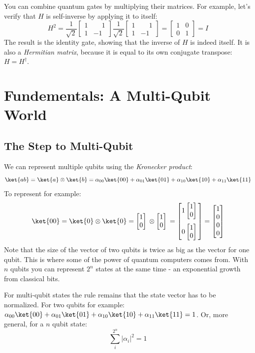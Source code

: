 \documentclass[11pt]{article}
\newcommand{\igate}{
  \begin{bmatrix}
  1 & 0 \\
  0 & 1
  \end{bmatrix}
}
\newcommand{\hgate}{
  \dfrac{1}{\sqrt2}
  \begin{bmatrix}
  1 & \phantom{-}1 \\
  1 & -1
  \end{bmatrix}
}
\newcommand{\qstatezero}{
  \begin{bmatrix}1 \\ 0\end{bmatrix}
}
\begin{document}
You can combine quantum gates by multiplying their matrices. For example, let's verify that $H$ is self-inverse by applying it to itself:
\[
  H^2 = \hgate{} \hgate{} = \igate{} = I
\]
The result is the identity gate, showing that the inverse of $H$ is indeed itself. It is also a \emph{Hermitian matrix}, because it is equal to its own conjugate transpose: $H = H^\dagger$.

\newpage

\section{Fundementals: A Multi-Qubit World}
\subsection{The Step to Multi-Qubit}
We can represent multiple qubits using the \emph{Kronecker product}:
\[
  \ket{ab} = \ket{a} \otimes \ket{b} = \alpha_{00}\ket{00} + \alpha_{01}\ket{01} + \alpha_{10}\ket{10} + \alpha_{11}\ket{11}
\]
To represent  for example:
\[
  \ket{00} = \ket{0} \otimes \ket{0} = \qstatezero{} \otimes \qstatezero{} =
  \begin{bmatrix}
  1\qstatezero{} \\[13pt]
  0\qstatezero{}
  \end{bmatrix}
  =
  \begin{bmatrix}
  1 \\
  0 \\
  0 \\
  0
  \end{bmatrix}
\]
Note that the size of the vector of two qubits is twice as big as the vector for one qubit. This is where some of the power of quantum computers comes from. With $n$ qubits you can represent $2^n$ states at the same time - an exponential growth from classical bits.

For multi-qubit states the rule remains that the state vector has to be normalized. For two qubits for example: $\alpha_{00}\ket{00} + \alpha_{01}\ket{01} + \alpha_{10}\ket{10} + \alpha_{11}\ket{11} = 1$. Or, more general, for a $n$ qubit state:
\[
\sum_{i}^{2^n} |\alpha_i|^2 = 1
\]
\end{document}
